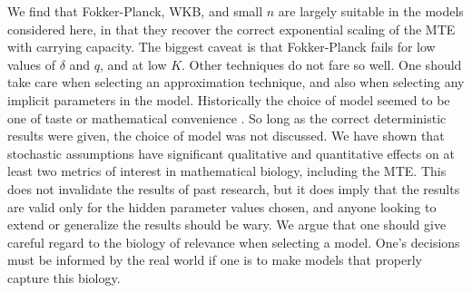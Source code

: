 We find that Fokker-Planck, WKB, and small $n$ are largely suitable in the models considered here, in that they recover the correct exponential scaling of the MTE with carrying capacity.
The biggest caveat is that Fokker-Planck fails for low values of $\delta$ and $q$, and at low $K$.  
Other techniques do not fare so well.
One should take care when selecting an approximation technique, and also when selecting any implicit parameters in the model. 
Historically the choice of model seemed to be one of taste or mathematical convenience \cite{Newman2004,Allen2005,Assaf2009}.
So long as the correct deterministic results were given, the choice of model was not discussed.
We have shown that stochastic assumptions have significant qualitative and quantitative effects on at least two metrics of interest in mathematical biology, including the MTE.
This does not invalidate the results of past research, but it does imply that the results are valid only for the hidden parameter values chosen, and anyone looking to extend or generalize the results should be wary. 
We argue that one should give careful regard to the biology of relevance when selecting a model. 
One’s decisions must be informed by the real world if one is to make models that properly capture this biology. 

